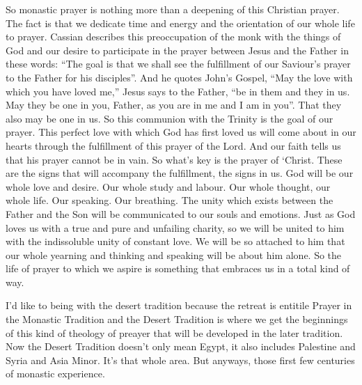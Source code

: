 So monastic prayer is nothing more than a deepening of this Christian prayer. The fact is that we dedicate time and energy and the orientation of our whole life to prayer. Cassian describes this preoccupation of the monk with the things of God and our desire to participate in the prayer between Jesus and the Father in these words: ``The goal is that we shall see the fulfillment of our Saviour's prayer to the Father for his disciples''. And he quotes John's Gospel, ``May the love with which you have loved me,'' Jesus says to the Father, ``be in them and they in us. May they be one in you, Father, as you are in me and I am in you''. That they also may be one in us. So this communion with the Trinity is the goal of our prayer. This perfect love with which God has first loved us will come about in our hearts through the fulfillment of this prayer of the Lord. And our faith tells us that his prayer cannot be in vain. So what's key is the prayer of `Christ. These are the signs that will accompany the fulfillment, the signs in us. God will be our whole love and desire. Our whole study and labour. Our whole thought, our whole life. Our speaking. Our breathing. The unity which exists between the Father and the Son will be communicated to our souls and emotions. Just as God loves us with a true and pure and unfailing charity, so we will be united to him with the indissoluble unity of constant love. We will be so attached to him that our whole yearning and thinking and speaking will be about him alone. So the life of prayer to which we aspire is something that embraces us in a total kind of way.

I'd like to being with  the desert tradition because the retreat is entitile Prayer in the Monastic Tradition and the Desert Tradition is where we get the beginnings of this kind of theology of preayer that will be developed in the later tradition. Now the Desert Tradition doesn't only mean Egypt, it also includes Palestine and Syria and Asia Minor. It's that whole area. But anyways, those first few centuries of monastic experience.

